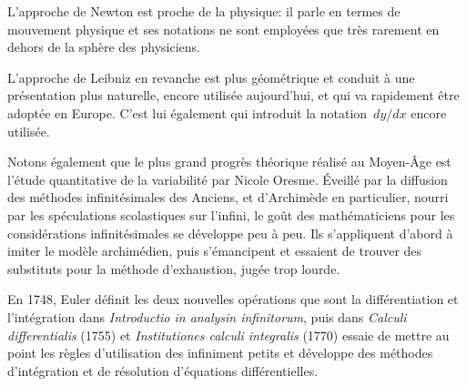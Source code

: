 \begin{histoire}
L'approche de Newton est proche de la physique: il parle en termes de mouvement physique et ses notations ne sont employées que très rarement en dehors de la sphère des physiciens.

L'approche de Leibniz en revanche est plus géométrique et conduit à une présentation plus naturelle, encore utilisée aujourd'hui, et qui va rapidement être adoptée en Europe. C'est lui également qui introduit la notation~$dy/dx$ encore utilisée.

\medskip
{}

\medskip
Notons également que le plus grand progrès théorique réalisé au Moyen-Âge est l'étude quantitative de la variabilité par Nicole Oresme.
Éveillé par la diffusion des méthodes infinitésimales des Anciens, et d'Archimède en particulier, nourri par les spéculations scolastiques sur l'infini, le goût des mathématiciens pour les considérations infinitésimales se développe peu à peu. Ils s'appliquent d'abord à imiter le modèle archimédien, puis s'émancipent et essaient de trouver des substituts pour la méthode d'exhaustion, jugée trop lourde.

\medskip
En 1748, Euler définit les deux nouvelles opérations que sont la différentiation et l'intégration dans \emph{Introductio in analysin infinitorum}, puis dans \emph{Calculi differentialis} (1755) et \emph{Institutiones calculi integralis} (1770) essaie de mettre au point les règles d'utilisation des infiniment petits et développe des méthodes d'intégration et de résolution d'équations différentielles.
\end{histoire}

